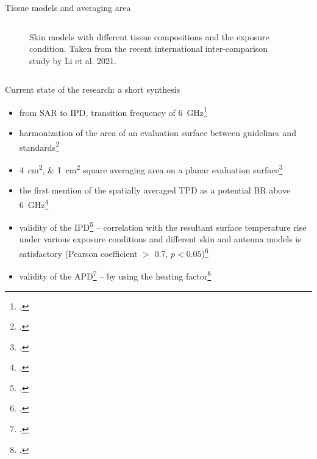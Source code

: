 \documentclass[xcolor=dvipsnames,10pt]{beamer}
\begin{document}
\begin{frame}{Tissue models and averaging area}
\begin{columns}[c]
\begin{column}{0.5\textwidth}
\begin{center}
\begin{figure}
                \caption{Skin models with different tissue compositions and the exposure condition. Taken from the recent international inter-comparison study by Li et al. 2021.}
            \end{figure}
            \end{center}
        \end{column}
    \end{columns}
\end{frame}

\begin{frame}{Current state of the research: a short synthesis}
    \begin{itemize}
        \item from SAR to IPD, transition frequency of \SI{6}{\GHz}\footcite{Anderson2010SAR,McIntosh2010SAR}
        \item harmonization of the area of an evaluation surface between guidelines and standards\footcite{Colombi2015,Thors2016Exposure,Xu2017Understanding}
        \item \SIlist{4;1}{\cm\squared} square averaging area on a planar evaluation surface\footcite{Hashimoto2017On,Funahashi2018Averaging,Foster2016Thermal,Foster2017Thermal}
        \item the first mention of the spatially averaged TPD as a potential BR above \SI{6}{\GHz}\footcite{Funahashi2018Area-Averaged}
        \item validity of the IPD\footcite{Sasaki2017Monte,Li2019Relationship,He2018RF,Diao2021Effect,Carrasco2019Exposure,Miura2021Power,Nakae2020Skin,Morimoto2022Assessment} -- correlation with the resultant surface temperature rise under various exposure conditions and different skin and antenna models is satisfactory (Pearson coefficient $>$ 0.7, $p < 0.05$)\footcite{DeSantis2022On}
        \item validity of the APD\footcite{Li2021Quantitative,Taguchi2022Computation,Li2023Calculated} -- by using the heating factor\footcite{Foster2018Modeling}
    \end{itemize}
\end{frame}
\end{document}
